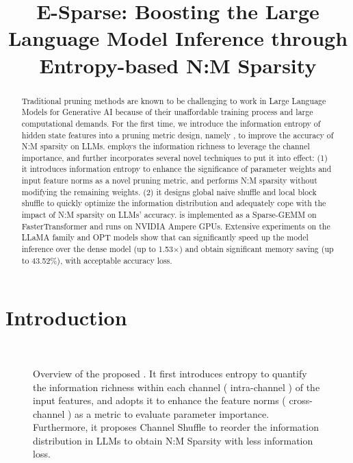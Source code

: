 \title{E-Sparse: Boosting the Large Language Model Inference through Entropy-based N:M Sparsity}



\maketitle

\begin{abstract}
Traditional pruning methods are known to be challenging to work in Large Language Models for Generative AI because of their unaffordable training process and large computational demands.
For the first time, we introduce the information entropy of hidden state features into a pruning metric design, namely \name, to improve the accuracy of N:M sparsity on LLMs.
\name employs the information richness to leverage the channel importance, and further incorporates several novel techniques to put it into effect:
(1) it introduces information entropy to enhance the significance of parameter weights and input feature norms as a novel pruning metric, and performs N:M sparsity without modifying the remaining weights.
(2) it designs global naive shuffle and local block shuffle to quickly optimize the information distribution and adequately cope with the impact of N:M sparsity on LLMs' accuracy.
\name is implemented as a Sparse-GEMM on FasterTransformer and runs on NVIDIA Ampere GPUs.
Extensive experiments on the LLaMA family and OPT models show that \name can significantly speed up the model inference over the dense model (up to 1.53$\times$) and obtain significant memory saving (up to 43.52\%), with acceptable accuracy loss.
\end{abstract}

\section{Introduction}

\begin{figure}[t]
\centering
{} \\
\vspace{0.5cm}
\caption{Overview of the proposed \name. It first introduces entropy to quantify the information richness within each channel ( intra-channel ) of the input features, and adopts it to enhance the feature norms ( cross-channel ) as a metric to evaluate parameter importance. Furthermore, it proposes Channel Shuffle to reorder the information distribution in LLMs to obtain N:M Sparsity with less information loss.}
\label{fig:overview}
\end{figure}

